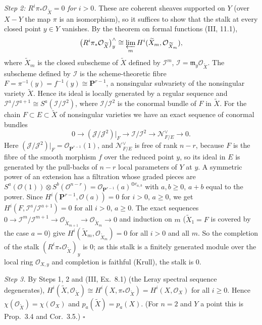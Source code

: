 \documentclass[11pt]{article}
\begin{document}
\emph{Step 2: $R^i\pi_*\mathcal O_{\widetilde X}=0$ for $i>0$.} These are coherent sheaves supported on $Y$ (over $X-Y$ the map $\pi$ is an isomorphism), so it suffices to show that the stalk at every closed point $y\in Y$ vanishes. By the theorem on formal functions (III, 11.1),
\[
\bigl(R^i\pi_*\mathcal O_{\widetilde X}\bigr)^\wedge_y\cong\varprojlim_m H^i(\widetilde X_m,\mathcal O_{\widetilde X_m}),
\]
where $\widetilde X_m$ is the closed subscheme of $\widetilde X$ defined by $\mathcal I^m$, $\mathcal I=\mathfrak m_y\mathcal O_{\widetilde X}$. The subscheme defined by $\mathcal I$ is the scheme-theoretic fibre $F=\pi^{-1}(y)=f^{-1}(y)\cong\mathbf P^{r-1}$, a nonsingular subvariety of the nonsingular variety $\widetilde X$. Hence its ideal is locally generated by a regular sequence and $\mathcal I^a/\mathcal I^{a+1}\cong S^a(\mathcal I/\mathcal I^2)$, where $\mathcal I/\mathcal I^2$ is the conormal bundle of $F$ in $\widetilde X$. For the chain $F\subset E\subset\widetilde X$ of nonsingular varieties we have an exact sequence of conormal bundles
\[
0\to(\mathcal J/\mathcal J^2)|_F\to\mathcal I/\mathcal I^2\to\mathcal N^\vee_{F/E}\to0 .
\]
Here $(\mathcal J/\mathcal J^2)|_F=\mathcal O_{\mathbf P^{r-1}}(1)$, and $\mathcal N^\vee_{F/E}$ is free of rank $n-r$, because $F$ is the fibre of the smooth morphism $f$ over the reduced point $y$, so its ideal in $E$ is generated by the pull-backs of $n-r$ local parameters of $Y$ at $y$. A symmetric power of an extension has a filtration whose graded pieces are $S^a(\mathcal O(1))\otimes S^b(\mathcal O^{n-r})=\mathcal O_{\mathbf P^{r-1}}(a)^{\oplus c_{a,b}}$ with $a,b\ge0$, $a+b$ equal to the power. Since $H^i(\mathbf P^{r-1},\mathcal O(a))=0$ for $i>0$, $a\ge0$, we get $H^i(F,\mathcal I^a/\mathcal I^{a+1})=0$ for all $i>0$, $a\ge0$. The exact sequences $0\to\mathcal I^m/\mathcal I^{m+1}\to\mathcal O_{\widetilde X_{m+1}}\to\mathcal O_{\widetilde X_m}\to0$ and induction on $m$ ($\widetilde X_1=F$ is covered by the case $a=0$) give $H^i(\widetilde X_m,\mathcal O_{\widetilde X_m})=0$ for all $i>0$ and all $m$. So the completion of the stalk $(R^i\pi_*\mathcal O_{\widetilde X})_y$ is $0$; as this stalk is a finitely generated module over the local ring $\mathcal O_{X,y}$ and completion is faithful (Krull), the stalk is $0$.

\emph{Step 3.} By Steps 1, 2 and (III, Ex.~8.1) (the Leray spectral sequence degenerates), $H^i(\widetilde X,\mathcal O_{\widetilde X})\cong H^i(X,\pi_*\mathcal O_{\widetilde X})=H^i(X,\mathcal O_X)$ for all $i\ge0$. Hence $\chi(\mathcal O_{\widetilde X})=\chi(\mathcal O_X)$ and $p_a(\widetilde X)=p_a(X)$. (For $n=2$ and $Y$ a point this is Prop.~3.4 and Cor.~3.5.) \hfill$\square$
\end{document}
